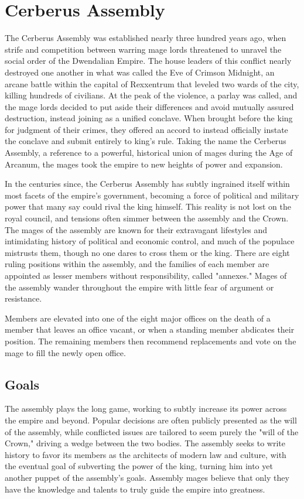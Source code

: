 \documentclass[10pt,a4paper,twoside,bg=print,twocolumn,openany,nodeprecatedcode]{dndbook}
\begin{document}
\section{Cerberus Assembly}
The Cerberus Assembly was established nearly three hundred years ago, when strife and competition between warring mage lords threatened to unravel the social order of the Dwendalian Empire. The house leaders of this conflict nearly destroyed one another in what was called the Eve of Crimson Midnight, an arcane battle within the capital of Rexxentrum that leveled two wards of the city, killing hundreds of civilians. At the peak of the violence, a parlay was called, and the mage lords decided to put aside their differences and avoid mutually assured destruction, instead joining as a unified conclave. When brought before the king for judgment of their crimes, they offered an accord to instead officially instate the conclave and submit entirely to king's rule. Taking the name the Cerberus Assembly, a reference to a powerful, historical union of mages during the Age of Arcanum, the mages took the empire to new heights of power and expansion.

In the centuries since, the Cerberus Assembly has subtly ingrained itself within most facets of the empire's government, becoming a force of political and military power that many say could rival the king himself. This reality is not lost on the royal council, and tensions often simmer between the assembly and the Crown. The mages of the assembly are known for their extravagant lifestyles and intimidating history of political and economic control, and much of the populace mistrusts them, though no one dares to cross them or the king. There are eight ruling positions within the assembly, and the families of each member are appointed as lesser members without responsibility, called "annexes." Mages of the assembly wander throughout the empire with little fear of argument or resistance.

Members are elevated into one of the eight major offices on the death of a member that leaves an office vacant, or when a standing member abdicates their position. The remaining members then recommend replacements and vote on the mage to fill the newly open office.

\subsection{Goals}
The assembly plays the long game, working to subtly increase its power across the empire and beyond. Popular decisions are often publicly presented as the will of the assembly, while conflicted issues are tailored to seem purely the "will of the Crown," driving a wedge between the two bodies. The assembly seeks to write history to favor its members as the architects of modern law and culture, with the eventual goal of subverting the power of the king, turning him into yet another puppet of the assembly's goals. Assembly mages believe that only they have the knowledge and talents to truly guide the empire into greatness.
\end{document}
